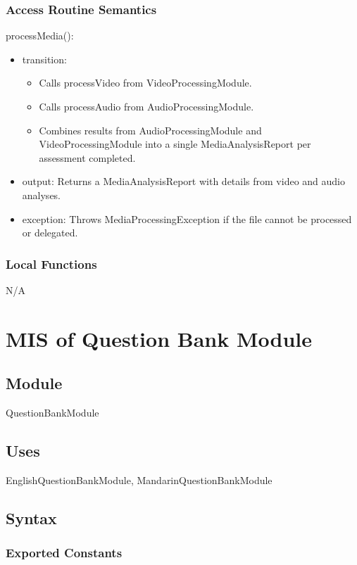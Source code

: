 \documentclass[12pt, titlepage]{article}
\begin{document}
\subsubsection{Access Routine Semantics}

\noindent processMedia():
\begin{itemize}
\item transition:
\begin{itemize}
\item Calls processVideo from VideoProcessingModule.
\item Calls processAudio from AudioProcessingModule.
\item Combines results from AudioProcessingModule and VideoProcessingModule into a single MediaAnalysisReport per assessment completed.
\end{itemize}
\item output: Returns a MediaAnalysisReport with details from video and audio analyses.
\item exception: Throws MediaProcessingException if the file cannot be processed or delegated.
\end{itemize}

\subsubsection{Local Functions}
N/A

\section{MIS of Question Bank Module} \label{QuestionBankModule}

\subsection{Module}

QuestionBankModule

\subsection{Uses}

EnglishQuestionBankModule, MandarinQuestionBankModule

\subsection{Syntax}

\subsubsection{Exported Constants}
\end{document}
